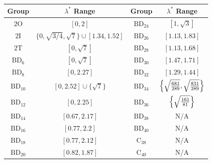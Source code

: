 \documentclass[8pt]{article}
\theoremstyle{definition}
\begin{document}
\begin{table}[h!]
    \centering
    \begin{tabular}{c | c || c | c}
        \toprule
        \textbf{Group}       & \(\lambda^*\) Range                               & \textbf{Group}       & \(\lambda^*\) Range                                                  \\
        \midrule
        \(2\mathrm{O}\)      & \([0, 2]\)                                        & \(\mathrm{BD}_{24}\) & \([1, \sqrt{3}]\)                                                    \\
        \(2\mathrm{I}\)      & \(\{0, \sqrt{3/4}, \sqrt{7}\} \cup [1.34, 1.52]\) & \(\mathrm{BD}_{26}\) & \([1.13, 1.83]\)                                                     \\
        \(2\mathrm{T}\)      & \([0, \sqrt{7}]\)                                 & \(\mathrm{BD}_{28}\) & \([1.13, 1.68]\)                                                     \\
        \(\mathrm{BD}_6\)    & \([0, \sqrt{7}]\)                                 & \(\mathrm{BD}_{30}\) & \([1.47, 1.71]\)                                                     \\
        \(\mathrm{BD}_8\)    & \([0, 2.27]\)                                     & \(\mathrm{BD}_{32}\) & \([1.29, 1.44]\)                                                     \\
        \(\mathrm{BD}_{10}\) & \([0, 2.52] \cup \{\sqrt{7}\}\)                   & \(\mathrm{BD}_{34}\) & \(\Bigl\{ \sqrt{\tfrac{681}{289}}, \sqrt{\tfrac{831}{289}} \Bigr\}\) \\
        \(\mathrm{BD}_{12}\) & \([0, 2.25]\)                                     & \(\mathrm{BD}_{36}\) & \(\Bigl\{ \sqrt{\tfrac{161}{81}} \Bigr\}\)                           \\
        \(\mathrm{BD}_{14}\) & \([0.67, 2.17]\)                                  & \(\mathrm{BD}_{38}\) & N/A                                                                  \\
        \(\mathrm{BD}_{16}\) & \([0.77, 2.2]\)                                   & \(\mathrm{BD}_{40}\) & N/A                                                                  \\
        \(\mathrm{BD}_{18}\) & \([0.77, 2.12]\)                                  & \(\mathrm{C}_{38}\)  & N/A                                                                  \\
        \(\mathrm{BD}_{20}\) & \([0.82, 1.87]\)                                  & \(\mathrm{C}_{40}\)  & N/A                                                                  \\

\end{tabular}
\end{table}
\end{document}
